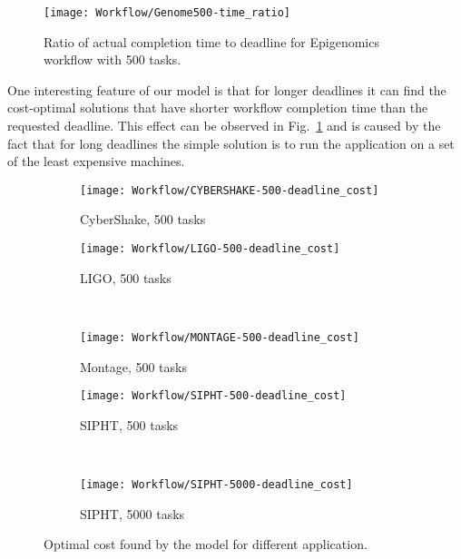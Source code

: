 {    \begin{figure}[tb]
       \centering \texttt{[image: Workflow/Genome500-time\_ratio]}
       \caption{Ratio of actual completion time to deadline for Epigenomics workflow with 500 tasks.
       \label{fig:workflow:genome-500-ratio}}
    \end{figure}
    
    One interesting feature of our model is that for longer deadlines it can find the cost-optimal solutions that have shorter workflow completion time than the requested deadline. This effect can be observed in Fig.~\ref{fig:workflow:genome-500-ratio} and is caused by the fact that for long deadlines the simple solution is to run the application on a set of the least expensive machines. 
    
    \begin{figure}[tb] 
       \centering       
       \begin{subfigure}[b]{0.49\textwidth}  
         \texttt{[image: Workflow/CYBERSHAKE-500-deadline\_cost]}
         \caption{CyberShake, 500 tasks}
         \label{fig:workflow:cybershake-500}
       \end{subfigure}
      \begin{subfigure}[b]{0.49\textwidth}  
        \texttt{[image: Workflow/LIGO-500-deadline\_cost]}
        \caption{LIGO, 500 tasks}
        \label{fig:workflow:ligo-500}
      \end{subfigure} \\ 
      \begin{subfigure}[b]{0.49\textwidth}  
        \texttt{[image: Workflow/MONTAGE-500-deadline\_cost]}
        \caption{Montage, 500 tasks}
        \label{fig:workflow:montage-500}
      \end{subfigure}             
      \begin{subfigure}[b]{0.49\textwidth}  
        \texttt{[image: Workflow/SIPHT-500-deadline\_cost]}
        \caption{SIPHT, 500 tasks}
        \label{fig:workflow:sipht-500}
      \end{subfigure}\\
      \begin{subfigure}[b]{0.49\textwidth}  
        \texttt{[image: Workflow/SIPHT-5000-deadline\_cost]}
        \caption{SIPHT, 5000 tasks}
        \label{fig:workflow:sipht-5000}
      \end{subfigure}
      \caption{\label{fig:other}Optimal cost found by the model for different application.}
    \end{figure}  
    
}

